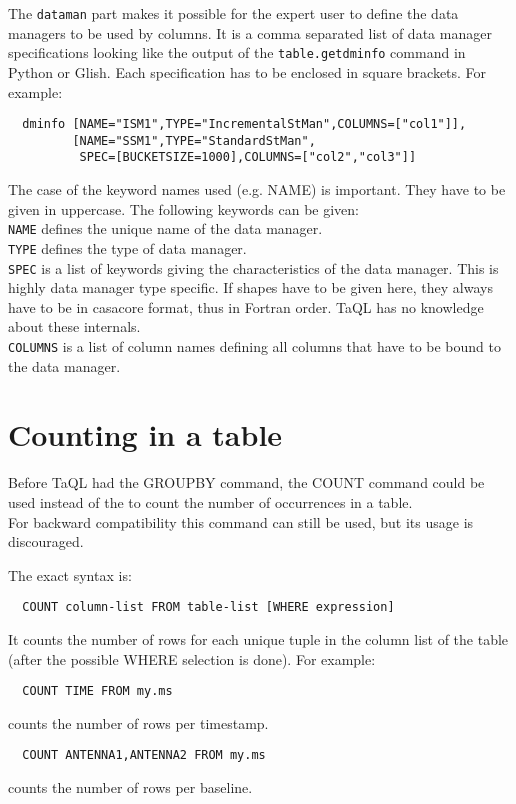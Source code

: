 The \texttt{dataman} part makes it possible for the expert user to
define the data managers to be used by columns. It is a comma separated
list of data manager specifications looking like the output of the
\texttt{table.getdminfo} command in Python or Glish.
Each specification has to be enclosed in square brackets.
For example:
\begin{verbatim}
  dminfo [NAME="ISM1",TYPE="IncrementalStMan",COLUMNS=["col1"]],
         [NAME="SSM1",TYPE="StandardStMan",
          SPEC=[BUCKETSIZE=1000],COLUMNS=["col2","col3"]]
\end{verbatim}
The case of the keyword names used (e.g. NAME) is important.
They have to be given in uppercase. The following keywords can be
given:
\\\texttt{NAME} defines the unique name of the data manager.
\\\texttt{TYPE} defines the type of data manager.
\\\texttt{SPEC} is a list of keywords giving the characteristics of the
data manager. This is highly data manager type specific. If shapes
have to be given here, they always have to be in casacore format,
thus in Fortran order. TaQL has no knowledge about these internals.
\\\texttt{COLUMNS} is a list of column names defining all columns that
have to be bound to the data manager.


\section{\label{TAQL:COUNTING}Counting in a table}
Before TaQL had the GROUPBY command, the COUNT command could be used
instead of the  
to count the number of occurrences in a table.
\\For backward compatibility this command can still be used, but its
usage is discouraged.

The exact syntax is:
\begin{verbatim}
  COUNT column-list FROM table-list [WHERE expression]
\end{verbatim}
It counts the number of rows for each unique tuple in the column list
of the table (after the possible WHERE selection is done).
For example:
\begin{verbatim}
  COUNT TIME FROM my.ms
\end{verbatim}
counts the number of rows per timestamp.
\begin{verbatim}
  COUNT ANTENNA1,ANTENNA2 FROM my.ms
\end{verbatim}
counts the number of rows per baseline.

